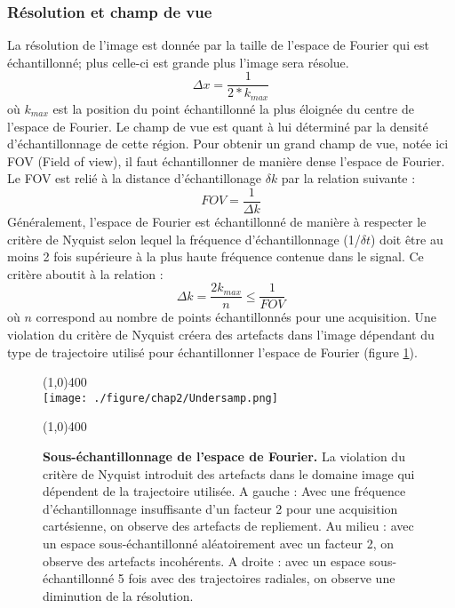 \subsubsection{Résolution et champ de vue}

La résolution de l'image est donnée par la taille de l'espace de Fourier qui est échantillonné; plus celle-ci est grande plus l'image sera résolue.
\begin{equation}
\Delta x = \frac{1}{2*k_{max}}
\end{equation}
où $k_{max}$ est la position du point échantillonné la plus éloignée du centre de l'espace de Fourier. Le champ de vue est quant à lui déterminé par la densité d'échantillonnage de cette région. Pour obtenir un grand champ de vue, notée ici FOV (Field of view), il faut échantillonner de manière dense l'espace de Fourier. Le FOV est relié à la distance d'échantillonage $\delta k$ par la relation suivante :
\begin{equation}
\label{eq:FOV}
FOV = \frac{1}{\Delta k}
\end{equation}
Généralement, l'espace de Fourier est échantillonné de manière à respecter le critère de Nyquist selon lequel la fréquence d'échantillonnage (1/$\delta t$) doit être au moins 2 fois supérieure à la plus haute fréquence contenue dans le signal. Ce critère aboutit à la relation :
\begin{equation}
\Delta k =\frac{2k_{max}}{n} \leq \frac{1}{FOV}
\end{equation}
où $n$ correspond au nombre de points échantillonnés pour une acquisition. Une violation du critère de Nyquist créera des artefacts dans l'image dépendant du type de trajectoire utilisé pour échantillonner l'espace de Fourier (figure \ref{fig:Undersamp}).
\begin{figure}[H]
\centering
\line(1,0){400} \\
\texttt{[image: ./figure/chap2/Undersamp.png]}
\caption[Sous-échantillonnage de l'espace de Fourier.]{\label{fig:Undersamp} \textbf{Sous-échantillonnage de l'espace de Fourier.} La violation du critère de Nyquist introduit des artefacts dans le domaine image qui dépendent de la trajectoire utilisée. A gauche : Avec une fréquence d'échantillonnage insuffisante d'un facteur 2 pour une acquisition cartésienne, on observe des artefacts de repliement. Au milieu : avec un espace sous-échantillonné aléatoirement avec un facteur 2, on observe des artefacts incohérents. A droite : avec un espace sous-échantillonné 5 fois avec des trajectoires radiales, on observe une diminution de la résolution.}
\line(1,0){400} \\
\end{figure}

